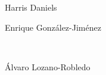 \begin{frame}[plain]
\begin{figure}[h]
\begin{subfigure}{0.25\textwidth}
	\caption{Harris Daniels}
	\end{subfigure} \enskip
	\begin{subfigure}{0.35\textwidth}
	\captionsetup{labelformat=empty}
	\centering
	\caption{Enrique Gonz\'alez-Jim\'enez}
	\end{subfigure} \\
	\begin{subfigure}{0.35\textwidth}
	\captionsetup{labelformat=empty}
	\centering
	\caption{\'Alvaro Lozano-Robledo}
	\end{subfigure} \quad
	\begin{subfigure}{0.25\textwidth}
	\captionsetup{labelformat=empty}
	\centering

\end{subfigure}
\end{figure}
\end{frame}
